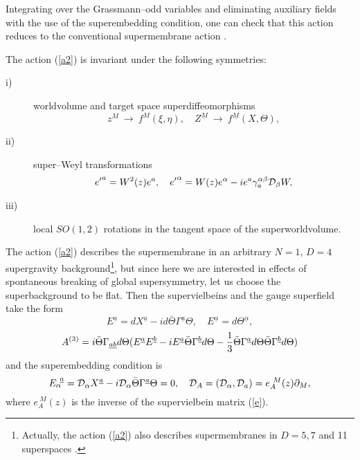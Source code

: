 \documentclass[a4paper,12pt]{article}
\begin{document}
Integrating over the Grassmann--odd variables and eliminating
auxiliary fields with the use of the superembedding condition,
one can check that this action reduces to the conventional
supermembrane action \cite{bst1}.

The action (\ref{a2}) is invariant under the following symmetries:
\begin{description}
\item[i)]
worldvolume and target space superdiffeomorphisms
\begin{equation}\label{sd}
z^M~\rightarrow~f^M(\xi,\eta), \quad Z^{\underline
M}~\rightarrow~f^{\underline M}(X,\Theta),
\end{equation}
\item[ii)]
super--Weyl transformations
\begin{equation}\label{superW}
{e'}^a=W^2(z)e^a, \quad
{e'}^\alpha=W(z)e^\alpha-ie^a\gamma_a^{\alpha\beta}{\cal D}_\beta
W,
\end{equation}
\item[iii)]
local $SO(1,2)$ rotations in the tangent space of the
superworldvolume.
\end{description}

The action (\ref{a2}) describes the supermembrane in an arbitrary
$N=1$, $D=4$ supergravity background\footnote{Actually, the action (\ref{a2})
also describes supermembranes in $D=5,7$ and 11 superspaces
\cite{pst}.}, but since here we are interested in effects of
spontaneous breaking of global supersymmetry, let us choose the
superbackground to be flat. Then the supervielbeins and the gauge
superfield take the form
\begin{equation}\label{calE}
{E}^{\underline a}={dX}^{\underline
a}-id\bar\Theta\Gamma^{\underline{a}}\Theta, \quad
E^{\underline\alpha}=d\Theta^{\underline\alpha},
\end{equation}
\begin{equation}\label{Aflat}
A^{(3)}=i\bar\Theta\Gamma_{\underline{ab}}d\Theta({
E}^{\underline a}{E}^{\underline b}-i{E}^{\underline a}
\bar\Theta\Gamma^{\underline{b}}d\Theta-
{1\over
3}\bar\Theta\Gamma^{\underline{a}}d\Theta\bar\Theta\Gamma^{\underline{b}}d\Theta)
\end{equation}
and the superembedding condition is
\begin{equation}\label{embflat}
{E}^{~\underline a}_\alpha={\cal D}_\alpha X^{\underline
a}-i{\cal D}_\alpha\bar\Theta\Gamma^{\underline a}\Theta=0, \quad
{\cal D}_A=({\cal D}_\alpha, {\cal D}_a)=e^{~M}_{A}(z)\partial_M,
\end{equation}
where $e^{~M}_{A}(z)$ is the inverse of the supervielbein matrix
(\ref{e}).
\end{document}
